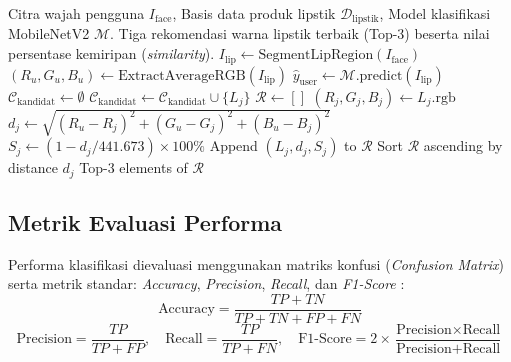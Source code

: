 \documentclass[10pt,a4paper]{article}
\begin{document}
\begin{algorithm}[htbp]
\caption{Algoritma Hybrid Recommendation System untuk Rekomendasi Lipstik}
\label{alg:hybrid}
\fontsize{8.5pt}{10.5pt}\selectfont
\begin{algorithmic}[1]
\Require Citra wajah pengguna $I_{\text{face}}$, Basis data produk lipstik $\mathcal{D}_{\text{lipstik}}$, Model klasifikasi MobileNetV2 $\mathcal{M}$.
\Ensure Tiga rekomendasi warna lipstik terbaik (Top-3) beserta nilai persentase kemiripan (\textit{similarity}).
\State $I_{\text{lip}} \gets \text{SegmentLipRegion}(I_{\text{face}})$ 
\State $(R_u, G_u, B_u) \gets \text{ExtractAverageRGB}(I_{\text{lip}})$
\State $\hat{y}_{\text{user}} \gets \mathcal{M}.\text{predict}(I_{\text{lip}})$ 
\State $\mathcal{C}_{\text{kandidat}} \gets \emptyset$
 
        \State $\mathcal{C}_{\text{kandidat}} \gets \mathcal{C}_{\text{kandidat}} \cup \{L_j\}$
    \EndIf
\EndFor
\State $\mathcal{R} \gets []$
 
    \State $(R_j, G_j, B_j) \gets L_j.\text{rgb}$
    \State $d_j \gets \sqrt{(R_u - R_j)^2 + (G_u - G_j)^2 + (B_u - B_j)^2}$
    \State $S_j \gets (1 - d_j / 441.673) \times 100\%$
    \State Append $(L_j, d_j, S_j)$ to $\mathcal{R}$
\EndFor
\State Sort $\mathcal{R}$ ascending by distance $d_j$
\State \Return Top-3 elements of $\mathcal{R}$
\end{algorithmic}
\end{algorithm}

\subsection{Metrik Evaluasi Performa}
Performa klasifikasi dievaluasi menggunakan matriks konfusi (\textit{Confusion Matrix}) serta metrik standar: \textit{Accuracy}, \textit{Precision}, \textit{Recall}, dan \textit{F1-Score} \cite{powers2011evaluation}:
\begin{equation}
  \text{Accuracy} = \frac{TP + TN}{TP + TN + FP + FN}
\end{equation}
\begin{equation}
  \text{Precision} = \frac{TP}{TP + FP}, \quad \text{Recall} = \frac{TP}{TP + FN}, \quad \text{F1-Score} = 2 \times \frac{\text{Precision} \times \text{Recall}}{\text{Precision} + \text{Recall}}
\end{equation}
\end{document}
